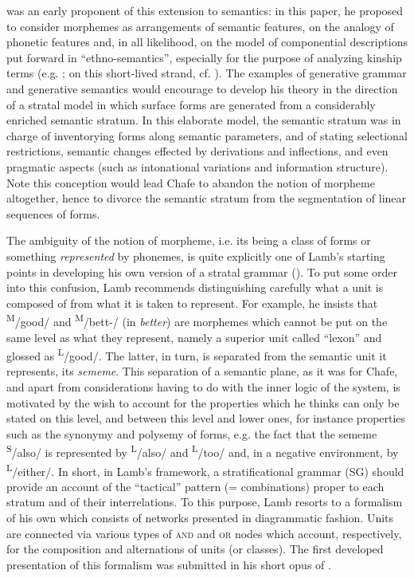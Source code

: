 \documentclass[english,output=paper,colorlinks,citecolor=brown]{../langscibook}
\begin{document}
\citet{Chafe1962} was an early proponent of this extension to semantics: in this paper, he proposed to consider morphemes as arrangements of semantic features, on the analogy of phonetic features and, in all likelihood, on the model of componential descriptions put forward in “ethno-semantics”, especially for the purpose of analyzing kinship terms (e.g. \citealt{Lounsbury1956}; on this short-lived strand, cf. \citealt{Murray1982}). The examples of generative grammar and generative semantics would encourage \citet{Chafe1970} to develop his theory in the direction of a stratal model in which surface forms are generated from a considerably enriched semantic stratum. In this elaborate model, the semantic stratum was in charge of inventorying forms along semantic parameters, and of stating selectional restrictions, semantic changes effected by derivations and inflections, and even pragmatic aspects (such as intonational variations and information structure). Note this conception would lead Chafe to abandon the notion of morpheme altogether, hence to divorce the semantic stratum from the segmentation of linear sequences of forms.

The ambiguity of the notion of morpheme, i.e. its being a class of forms or something \textit{represented} by phonemes, is quite explicitly one of Lamb’s starting points in developing his own version of a stratal grammar (\citealt{Lamb1964}). To put some order into this confusion, Lamb recommends distinguishing carefully what a unit is composed of from what it is taken to represent. For example, he insists that \textsuperscript{M}/good/ and \textsuperscript{M}/bett-/ (in \textit{better}) are morphemes which cannot be put on the same level as what they represent, namely a superior unit called “lexon” and glossed as \textsuperscript{L}/good/. The latter, in turn, is separated from the semantic unit it represents, its \textit{sememe}. This separation of a semantic plane, as it was for Chafe, and apart from considerations having to do with the inner logic of the system, is motivated by the wish to account for the properties which he thinks can only be stated on this level, and between this level and lower ones, for instance properties such as the synonymy and polysemy of forms, e.g. the fact that the sememe \textsuperscript{S}/also/ is represented by \textsuperscript{L}/also/ and \textsuperscript{L}/too/ and, in a negative environment, by \textsuperscript{L}/either/. In short, in Lamb’s framework, a stratificational grammar (SG) should provide an account of the “tactical” pattern (= combinations) proper to each stratum and of their interrelations. To this purpose, Lamb resorts to a formalism of his own which consists of networks presented in diagrammatic fashion. Units are connected via various types of \textsc{and} and \textsc{or} nodes which account, respectively, for the composition and alternations of units (or classes). The first developed presentation of this formalism was submitted in his short opus of \citeyear{Lamb1966}.
\end{document}
